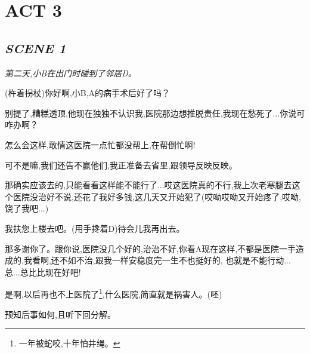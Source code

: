 \documentclass[11pt,a4paper,oneside]{memoir}  %
\begin{document}
\chapter*{ACT 3}

\section*{\hfill\textit{SCENE 1}}
\begin{description}[itemsep=1ex,leftmargin=1cm]
    \setlength{\parskip}{5pt}
    \item[] \hfill

    \textit{第二天,小\textup{B}在出门时碰到了邻居\textup{D}。}
    \item[邻居D] (杵着拐杖)你好啊,小B,A的病手术后好了吗？ 
    \item[小B] 别提了,糟糕透顶,他现在独独不认识我,医院那边想推脱责任,我现在愁死了...你说可咋办啊？
    \item[邻居D] 怎么会这样,敢情这医院一点忙都没帮上,在帮倒忙啊!
    \item[小B] 可不是嘛,我们还告不赢他们,我正准备去省里,跟领导反映反映。
    \item[邻居D] 那确实应该去的,只能看看这样能不能行了...哎这医院真的不行,我上次老寒腿去这个医院没治好不说,还花了我好多钱,这几天又开始犯了(哎呦哎呦又开始疼了,哎呦,饶了我吧...)
    \item[小B] 我扶您上楼去吧。(用手搀着\textup{D})待会儿我再出去。
    \item[邻居D] 那多谢你了。跟你说,医院没几个好的,治治不好,你看A现在这样,不都是医院一手造成的,我看啊,还不如不治,跟我一样安稳度完一生不也挺好的,
    也就是不能行动...总...总比比现在好吧!
    \item[小B] 是啊,以后再也不上医院了\footnote{一年被蛇咬,十年怕井绳。},什么医院,简直就是祸害人。(呸)
\end{description}
\vskip 1cm

\clearpage

\Huge{预知后事如何,且听下回分解。}
\end{document}
